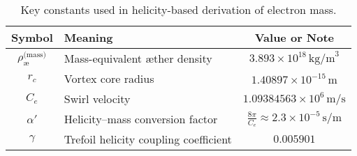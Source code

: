 \begin{table}[H]
\centering
\footnotesize
\renewcommand{\arraystretch}{1.4}
\begin{tabular}{|c|l|c|}
\hline
\textbf{Symbol} & \textbf{Meaning} & \textbf{Value or Note} \\
\hline
\( \rho_\text{\ae}^{\text{(mass)}} \) & Mass-equivalent æther density & \( 3.893 \times 10^{18} \, \text{kg/m}^3 \) \\
\( r_c \) & Vortex core radius & \( 1.40897 \times 10^{-15} \, \text{m} \) \\
\( C_e \) & Swirl velocity & \( 1.09384563 \times 10^6 \, \text{m/s} \) \\
\( \alpha' \) & Helicity–mass conversion factor & \( \frac{8\pi}{C_e} \approx 2.3 \times 10^{-5} \, \text{s/m} \) \\
\( \gamma \) & Trefoil helicity coupling coefficient & \( \boxed{0.005901} \) \\
\hline
\end{tabular}
\caption{Key constants used in helicity-based derivation of electron mass.}
\end{table}
